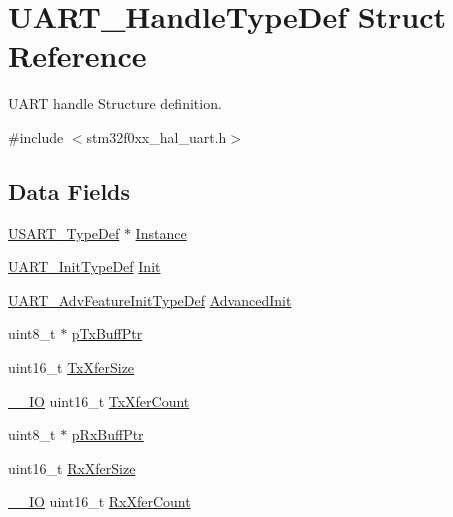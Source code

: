\hypertarget{struct_u_a_r_t___handle_type_def}{}\section{U\+A\+R\+T\+\_\+\+Handle\+Type\+Def Struct Reference}
\label{struct_u_a_r_t___handle_type_def}


U\+A\+RT handle Structure definition.  




{\ttfamily \#include $<$stm32f0xx\+\_\+hal\+\_\+uart.\+h$>$}

\subsection*{Data Fields}
\begin{DoxyCompactItemize}
\item 
\hyperlink{struct_u_s_a_r_t___type_def}{U\+S\+A\+R\+T\+\_\+\+Type\+Def} $\ast$ \hyperlink{struct_u_a_r_t___handle_type_def_a2b30b6d22df80fbebd8ceefc6f162310}{Instance}
\item 
\hyperlink{struct_u_a_r_t___init_type_def}{U\+A\+R\+T\+\_\+\+Init\+Type\+Def} \hyperlink{struct_u_a_r_t___handle_type_def_a6b5ab0619ea07655a7f3bc92f78fafaa}{Init}
\item 
\hyperlink{struct_u_a_r_t___adv_feature_init_type_def}{U\+A\+R\+T\+\_\+\+Adv\+Feature\+Init\+Type\+Def} \hyperlink{struct_u_a_r_t___handle_type_def_a4785c6c4b0e998062a50b706a739c6c5}{Advanced\+Init}
\item 
uint8\+\_\+t $\ast$ \hyperlink{struct_u_a_r_t___handle_type_def_a5cc31f7c52dafd32f27f8f2756dbf343}{p\+Tx\+Buff\+Ptr}
\item 
uint16\+\_\+t \hyperlink{struct_u_a_r_t___handle_type_def_a80907b65d6f9541bc0dee444d16bc45b}{Tx\+Xfer\+Size}
\item 
\hyperlink{core__sc300_8h_aec43007d9998a0a0e01faede4133d6be}{\+\_\+\+\_\+\+IO} uint16\+\_\+t \hyperlink{struct_u_a_r_t___handle_type_def_a1823437fbed80bdd1510782ced4e5532}{Tx\+Xfer\+Count}
\item 
uint8\+\_\+t $\ast$ \hyperlink{struct_u_a_r_t___handle_type_def_a7cee540cb21048ac48ba17355440e668}{p\+Rx\+Buff\+Ptr}
\item 
uint16\+\_\+t \hyperlink{struct_u_a_r_t___handle_type_def_ac12f5f1f6295b3c3327d5feabf5a96fb}{Rx\+Xfer\+Size}
\item 
\hyperlink{core__sc300_8h_aec43007d9998a0a0e01faede4133d6be}{\+\_\+\+\_\+\+IO} uint16\+\_\+t \hyperlink{struct_u_a_r_t___handle_type_def_ad95a26d6b12b7087bba3d1b769175db2}{Rx\+Xfer\+Count}

\end{DoxyCompactItemize}
